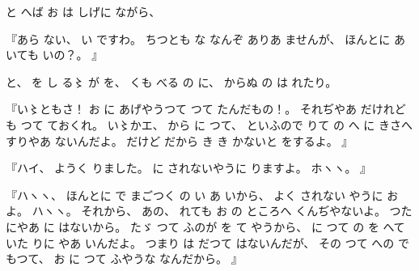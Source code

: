 %
と
へば
お
は
しげに
ながら、

%
『あら
ない、
%
い
ですわ。
%
ちつとも
な
なんぞ
ありあ
ませんが、
%
ほんとに
あ
いても%
いの？。
』

%
と、
%
を
し
る〻%
が
を、
%
くも
べる
の
に、
%
からぬ
の
は%
れたり。

%
『い〻ともさ！%
お
に
あげやうつて
つて
たんだもの！。
%
それぢやあ
だけれども
つて
ておくれ。
%
い〻かエ、%
%
から
に%
つて、
%
といふので
りて
の
へ
に
きさへすりやあ
ないんだよ。
%
だけど
だから
き
き%
かないと
をするよ。
』

%
『ハイ、
%
ようく
りました。
%
に
されないやうに
りますよ。
%
ホヽヽ。
』

%
『ハヽヽ、
%
ほんとに
で
まごつく
の
い
あ
いから、
%
よく
されない
やうに
お
よ。
%
ハヽヽ。
%
それから、
%
あの、
%
れても
お
の
ところへ
くんぢやないよ。
%
つた
にやあ
に
はないから。
%
たゞ%
つて
ふのが
を
て
やうから、
%
に
つて
の
を
へて
いた
りに
やあ
いんだよ。
%
つまり
は
だつて
はないんだが、
%
その
つて
への
で
もつて、
%
お
に
つて
ふやうな
なんだから。
』

